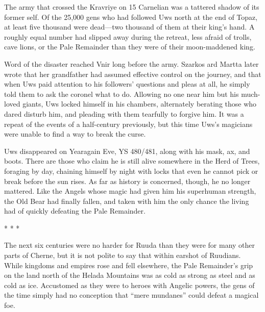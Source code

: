 \documentclass[12pt]{report}
\begin{document}
The army that crossed the Kravriye on 15 Carnelian was a tattered
shadow of its former self.  Of the 25,000 gens who had followed Uws
north at the end of Topaz, at least five thousand were dead---two
thousand of them at their king's hand.  A roughly equal number had
slipped away during the retreat, less afraid of trolls, cave lions, or
the Pale Remainder than they were of their moon-maddened king.

Word of the disaster reached Vnir long before the army.  Szarkos ard
Martta later wrote that her grandfather had assumed effective control
on the journey, and that when Uws paid attention to his followers'
questions and pleas at all, he simply told them to ask the coronel
what to do.  Allowing no one near him but his much-loved giants, Uws
locked himself in his chambers, alternately berating those who dared
disturb him, and pleading with them tearfully to forgive him.  It was
a repeat of the events of a half-century previously, but this time
Uws's magicians were unable to find a way to break the curse.

Uws disappeared on Yearagain Eve, YS 480/481, along with his mask, ax,
and boots.  There are those who claim he is still alive somewhere in
the Herd of Trees, foraging by day, chaining himself by night with
locks that even he cannot pick or break before the sun rises.  As far
as history is concerned, though, he no longer mattered.  Like the
Angels whose magic had given him his superhuman strength, the Old Bear
had finally fallen, and taken with him the only chance the living had
of quickly defeating the Pale Remainder.

\begin{center}
* * *
\end{center}

The next six centuries were no harder for Ruuda than they were for
many other parts of Cherne, but it is not polite to say that within
earshot of Ruudians.  While kingdoms and empires rose and fell
elsewhere, the Pale Remainder's grip on the land north of the Helada
Mountains was as cold as strong as steel and as cold as ice.
Accustomed as they were to heroes with Angelic powers, the gens of the
time simply had no conception that ``mere mundanes'' could defeat a
magical foe.
\end{document}
